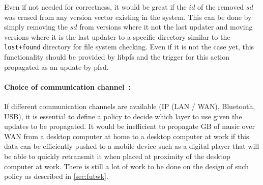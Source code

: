 Even if not needed for correctness, it would be great if the $id$ of
the removed $sd$ was erased from any version vector existing in the
system. This can be done by simply removing the $sd$ from versions
where it not the last updater and moving versions where it is the last
updater to a specific directory similar to the {\tt lost+found} directory
for file system checking. Even if it is not the case yet, this
functionality should be provided by libpfs and the trigger for this
action propagated as an update by pfsd.

\paragraph {Choice of communication channel~:}
If different communication channels are available (IP (LAN / WAN),
Bluetooth, USB), it is essential to define a policy to decide which
layer to use given the updates to be propagated. It would be
inefficient to propagate GB of music over WAN from a desktop computer
at home to a desktop computer at work if this data can be efficiently
pushed to a mobile device such as a digital player that will be able
to quickly retransmit it when placed at proximity of the desktop
computer at work. There is still a lot of work to be done on the
design of such policy as described in \ref{sec:futwk}.


